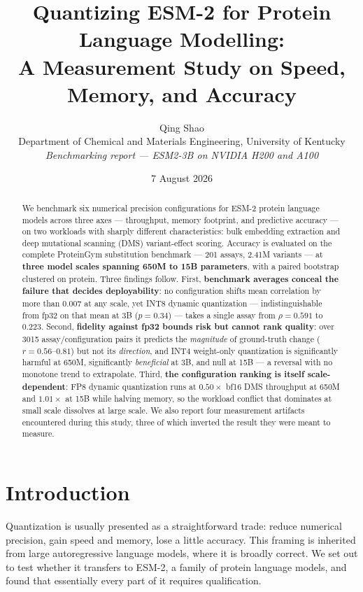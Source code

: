\documentclass[11pt]{article}
\title{\textbf{Quantizing ESM-2 for Protein Language Modelling:\\
A Measurement Study on Speed, Memory, and Accuracy}}
\author{Qing Shao\\[2pt]
Department of Chemical and Materials Engineering, University of Kentucky\\[2pt]
\emph{Benchmarking report --- ESM2-3B on NVIDIA H200 and A100}}
\date{7 August 2026}
\begin{document}
\maketitle

\begin{abstract}
\noindent
We benchmark six numerical precision configurations for ESM-2 protein language
models across three axes --- throughput, memory footprint, and predictive
accuracy --- on two workloads with sharply different characteristics: bulk
embedding extraction and deep mutational scanning (DMS) variant-effect scoring.
Accuracy is evaluated on the complete ProteinGym substitution benchmark ---
201 assays, 2.41M variants --- at \textbf{three model scales spanning 650M to
15B parameters}, with a paired bootstrap clustered on protein. Three findings
follow. First, \textbf{benchmark averages conceal the failure that decides
deployability}: no configuration shifts mean correlation by more than $0.007$ at
any scale, yet INT8 dynamic quantization --- indistinguishable from fp32 on that
mean at 3B ($p = 0.34$) --- takes a single assay from $\rho = 0.591$ to $0.223$.
Second, \textbf{fidelity against fp32 bounds risk but cannot rank quality}: over
3015 assay/configuration pairs it predicts the \emph{magnitude} of ground-truth
change ($r = 0.56$--$0.81$) but not its \emph{direction}, and INT4 weight-only
quantization is significantly harmful at 650M, significantly \emph{beneficial}
at 3B, and null at 15B --- a reversal with no monotone trend to extrapolate.
Third, \textbf{the configuration ranking is itself scale-dependent}: FP8 dynamic
quantization runs at $0.50\times$ bf16 DMS throughput at 650M and $1.01\times$
at 15B while halving memory, so the workload conflict that dominates at small scale
dissolves at large scale. We also report four measurement artifacts encountered
during this study, three of which inverted the result they were meant to
measure.
\end{abstract}

\section{Introduction}

Quantization is usually presented as a straightforward trade: reduce numerical
precision, gain speed and memory, lose a little accuracy. This framing is
inherited from large autoregressive language models, where it is broadly
correct. We set out to test whether it transfers to ESM-2, a family of protein
language models, and found that essentially every part of it requires
qualification.
\end{document}
